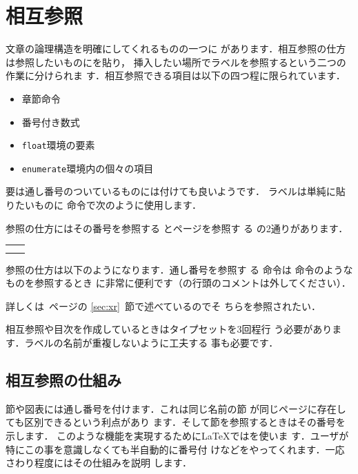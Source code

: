 \section{相互参照}
文章の論理構造を明確にしてくれるものの一つに{}
があります．相互参照の仕方は参照したいものにを貼り，
挿入したい場所でラベルを参照するという二つの作業に分けられま
す．相互参照できる項目は以下の四つ程に限られています．
%
\begin{itemize}
\item  章節命令 
\item  番号付き数式 
\item  \texttt{float}環境の要素
\item  \texttt{enumerate}環境内の個々の項目
\end{itemize}
要は通し番号のついているものには付けても良いようです．
ラベルは単純に貼りたいものに  命令で次のように使用します．
\begin{Syntax}
\end{Syntax}

参照の仕方にはその番号を参照する  とページを参照す
る の2通りがあります．
\begin{Syntax}
\begin{tabular}{ll}
 \cmd{ref}\pa{ラベル}     &\pp{通し番号}\\
 \cmd{pageref}\pa{ラベル} &\pp{ページ番号}\\
\end{tabular}
\end{Syntax}
参照の仕方は以下のようになります．通し番号を参照す
る  命令は  命令のようなものを参照するとき
に非常に便利です（の行頭のコメントは外してください）．
\begin{InOut}
詳しくは\pageref{sec:xr}~ページの
\ref{sec:xr}~節で述べているのでそ
ちらを参照されたい．
\end{InOut}

相互参照や目次を作成しているときはタイプセットを3回程行
う必要があります．ラベルの名前が重複しないように工夫する
事も必要です．


\subsection{相互参照の仕組み}%
節や図表には通し番号を付けます．これは同じ名前の節 
が同じページに存在しても区別できるという利点があり
ます．そして節を参照するときはその番号を示します．
このような機能を実現するために{\LaTeX}では{}を使いま
す．ユーザが特にこの事を意識しなくても半自動的に番号付
けなどをやってくれます．一応さわり程度にはその仕組みを説明
します．

